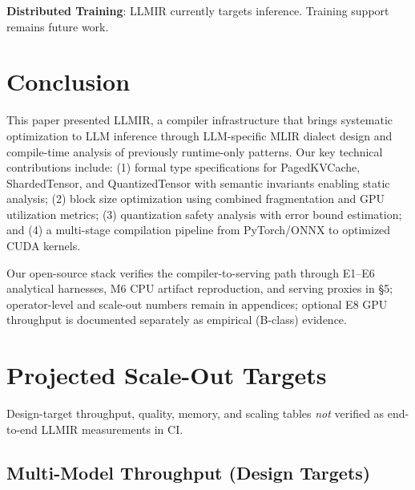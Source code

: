 \documentclass[conference]{IEEEtran}
\begin{document}
\textbf{Distributed Training}: LLMIR currently targets inference. Training support remains future work.

\section{Conclusion}

This paper presented LLMIR, a compiler infrastructure that brings systematic optimization to LLM inference through LLM-specific MLIR dialect design and compile-time analysis of previously runtime-only patterns. Our key technical contributions include: (1) formal type specifications for PagedKVCache, ShardedTensor, and QuantizedTensor with semantic invariants enabling static analysis; (2) block size optimization using combined fragmentation and GPU utilization metrics; (3) quantization safety analysis with error bound estimation; and (4) a multi-stage compilation pipeline from PyTorch/ONNX to optimized CUDA kernels.

Our open-source stack verifies the compiler-to-serving path through E1--E6 analytical harnesses, M6 CPU artifact reproduction, and serving proxies in \S5; operator-level and scale-out numbers remain in appendices; optional E8 GPU throughput is documented separately as empirical (B-class) evidence.

\appendix
\section{Projected Scale-Out Targets}
\label{app:projected}

Design-target throughput, quality, memory, and scaling tables \emph{not} verified as end-to-end LLMIR measurements in CI.

\subsection{Multi-Model Throughput (Design Targets)}
\end{document}
